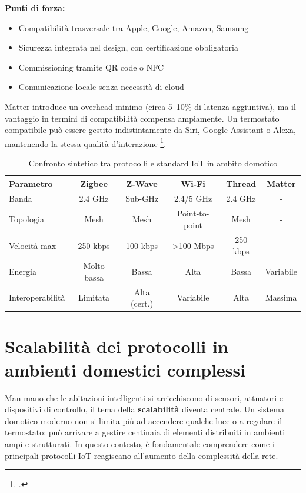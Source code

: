 \textbf{Punti di forza:}
\begin{itemize}
    \item Compatibilità trasversale tra Apple, Google, Amazon, Samsung
    \item Sicurezza integrata nel design, con certificazione obbligatoria
    \item Commissioning tramite QR code o NFC
    \item Comunicazione locale senza necessità di cloud
\end{itemize}

Matter introduce un overhead minimo (circa 5–10\% di latenza aggiuntiva), ma il vantaggio in termini di compatibilità compensa ampiamente. Un termostato compatibile può essere gestito indistintamente da Siri, Google Assistant o Alexa, mantenendo la stessa qualità d’interazione \footcite{MatterWhitePaper}.

\begin{table}[htbp]
\centering
\begin{tabular}{|l|c|c|c|c|c|}
\hline
\textbf{Parametro} & \textbf{Zigbee} & \textbf{Z-Wave} & \textbf{Wi-Fi} & \textbf{Thread} & \textbf{Matter} \\
\hline
Banda & 2.4 GHz & Sub-GHz & 2.4/5 GHz & 2.4 GHz & - \\
Topologia & Mesh & Mesh & Point-to-point & Mesh & - \\
Velocità max & 250 kbps & 100 kbps & \textgreater100 Mbps & 250 kbps & - \\
Energia & Molto bassa & Bassa & Alta & Bassa & Variabile \\
Interoperabilità & Limitata & Alta (cert.) & Variabile & Alta & Massima \\
\hline
\end{tabular}
\caption{Confronto sintetico tra protocolli e standard IoT in ambito domotico}
\label{tab:confronto-protocolli}
\end{table}

\section{Scalabilità dei protocolli in ambienti domestici complessi}

Man mano che le abitazioni intelligenti si arricchiscono di sensori, attuatori e dispositivi di controllo, il tema della \textbf{scalabilità} diventa centrale. Un sistema domotico moderno non si limita più ad accendere qualche luce o a regolare il termostato: può arrivare a gestire centinaia di elementi distribuiti in ambienti ampi e strutturati. In questo contesto, è fondamentale comprendere come i principali protocolli IoT reagiscano all’aumento della complessità della rete.

